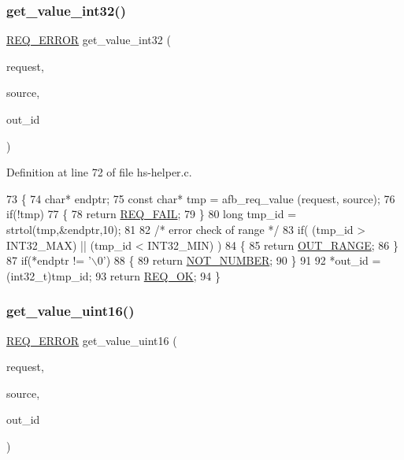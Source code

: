 \subsubsection{\texorpdfstring{get\+\_\+value\+\_\+int32()}{get\_value\_int32()}}
{\footnotesize\ttfamily \hyperlink{hs-helper_8h_aa49f1dbbf26f01627a5737cf43aad899}{R\+E\+Q\+\_\+\+E\+R\+R\+OR} get\+\_\+value\+\_\+int32 (\begin{DoxyParamCaption}\item[{const struct afb\+\_\+req}]{request,  }\item[{const char $\ast$}]{source,  }\item[{int32\+\_\+t $\ast$}]{out\+\_\+id }\end{DoxyParamCaption})}



Definition at line 72 of file hs-\/helper.\+c.


\begin{DoxyCode}
73 \{
74     \textcolor{keywordtype}{char}* endptr;
75     \textcolor{keyword}{const} \textcolor{keywordtype}{char}* tmp = afb\_req\_value (request, source);
76     \textcolor{keywordflow}{if}(!tmp)
77     \{
78         \textcolor{keywordflow}{return} \hyperlink{hs-helper_8h_aa49f1dbbf26f01627a5737cf43aad899a96a855966bc63045222b3dcac524cee1}{REQ\_FAIL};
79     \}
80     \textcolor{keywordtype}{long} tmp\_id = strtol(tmp,&endptr,10);
81 
82     \textcolor{comment}{/* error check of range */}
83     \textcolor{keywordflow}{if}( (tmp\_id > INT32\_MAX) || (tmp\_id < INT32\_MIN) )
84     \{
85         \textcolor{keywordflow}{return} \hyperlink{hs-helper_8h_aa49f1dbbf26f01627a5737cf43aad899add1c84bf80c5f80741ee8f37fef1e12b}{OUT\_RANGE};
86     \}
87     \textcolor{keywordflow}{if}(*endptr != \textcolor{charliteral}{'\(\backslash\)0'})
88     \{
89         \textcolor{keywordflow}{return} \hyperlink{hs-helper_8h_aa49f1dbbf26f01627a5737cf43aad899aa223eed65c9bee2bf1f4cdecaf90d66a}{NOT\_NUMBER};
90     \}
91 
92     *out\_id = (int32\_t)tmp\_id;
93     \textcolor{keywordflow}{return} \hyperlink{hs-helper_8h_aa49f1dbbf26f01627a5737cf43aad899ab093abb14c097b3b7719debb04d5e8ee}{REQ\_OK};
94 \}
\end{DoxyCode}
\mbox{\label{hs-helper_8c_a649900645417f2df3a70b9ad67529f53}} 
\subsubsection{\texorpdfstring{get\+\_\+value\+\_\+uint16()}{get\_value\_uint16()}}
{\footnotesize\ttfamily \hyperlink{hs-helper_8h_aa49f1dbbf26f01627a5737cf43aad899}{R\+E\+Q\+\_\+\+E\+R\+R\+OR} get\+\_\+value\+\_\+uint16 (\begin{DoxyParamCaption}\item[{const struct afb\+\_\+req}]{request,  }\item[{const char $\ast$}]{source,  }\item[{uint16\+\_\+t $\ast$}]{out\+\_\+id }\end{DoxyParamCaption})}



